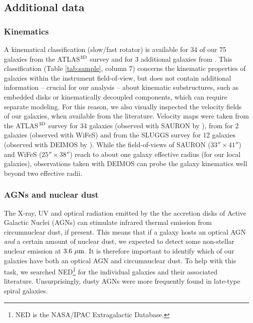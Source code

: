 \documentclass[preprint2]{emulateapj}
\begin{document}
\subsection{Additional data}
\label{sec:adddata}
\subsubsection{Kinematics}
\label{sec:kinem}
A kinematical classification (slow/fast rotator) is available for 34 of our 75 galaxies 
from the ATLAS$^{\rm 3D}$ survey \citep{atlas3dIII-MNRAS} 
and for 3 additional galaxies from \citet{scott2014}.
This classification (Table \ref{tab:sample}, column 7) 
concerns the kinematic properties of galaxies within the instrument field-of-view, %
but does not contain additional information -- crucial for our analysis -- about kinematic substructures, 
such as embedded disks or kinematically decoupled components, 
which can require separate modeling.
For this reason, we also visually inspected the velocity fields of our galaxies, 
when available from the literature.
Velocity maps were taken from the ATLAS$^{\rm 3D}$ survey for 34 galaxies 
(observed with SAURON by \citealt{krajnovic2011}),
from \citet{scott2014} for 2 galaxies 
(observed with WiFeS)
and from the SLUGGS survey for 12 galaxies 
(observed with DEIMOS by \citealt{arnold2014}).
While the field-of-views of SAURON ($33'' \times 41''$) and WiFeS ($25'' \times 38''$) 
reach to about one galaxy effective radius (for our local galaxies),
observations taken with DEIMOS can probe the galaxy kinematics well beyond two effective radii.

\subsubsection{AGNs and nuclear dust}
The X-ray, UV and optical radiation 
emitted by the the accretion disks of Active Galactic Nuclei (AGNs) can stimulate infrared thermal emission 
from circumnuclear dust, if present. 
This means that if a galaxy hosts an optical AGN \emph{and} a certain amount of nuclear dust,
we expected to detect some non-stellar nuclear emission at $3.6~\rm \mu m$.
It is therefore important to identify which of our galaxies have both an optical AGN and circumnuclear dust.
To help with this task, we searched NED\footnote{NED is the NASA/IPAC Extragalactic Database.} 
for the individual galaxies and their associated literature.
Unsurprisingly, dusty AGNs were more frequently found in late-type spiral galaxies.
\end{document}
